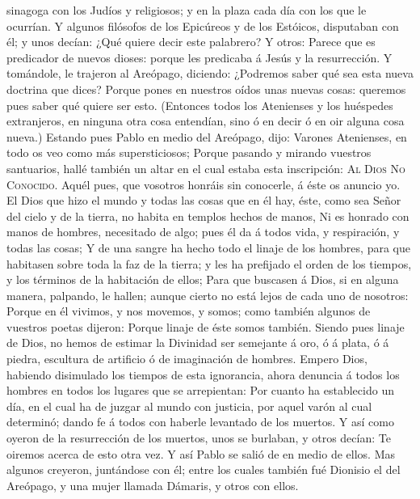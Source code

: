sinagoga con los Judíos y religiosos; y en la plaza cada día con los que
le ocurrían.  Y algunos filósofos de los Epicúreos y de
los Estóicos, disputaban con él; y unos decían: ¿Qué quiere decir este
palabrero? Y otros: Parece que es predicador de nuevos dioses: porque
les predicaba á Jesús y la resurrección.  Y tomándole, le
trajeron al Areópago, diciendo: ¿Podremos saber qué sea esta nueva
doctrina que dices?  Porque pones en nuestros oídos unas
nuevas cosas: queremos pues saber qué quiere ser esto. 
(Entonces todos los Atenienses y los huéspedes extranjeros, en ninguna
otra cosa entendían, sino ó en decir ó en oir alguna cosa nueva.)
 Estando pues Pablo en medio del Areópago, dijo: Varones
Atenienses, en todo os veo como más supersticiosos; 
Porque pasando y mirando vuestros santuarios, hallé también un altar en
el cual estaba esta inscripción: \textsc{Al} \textsc{Dios} \textsc{No}
\textsc{Conocido}. Aquél pues, que vosotros honráis sin conocerle, á
éste os anuncio yo.  El Dios que hizo el mundo y todas
las cosas que en él hay, éste, como sea Señor del cielo y de la tierra,
no habita en templos hechos de manos,  Ni es honrado con
manos de hombres, necesitado de algo; pues él da á todos vida, y
respiración, y todas las cosas;  Y de una sangre ha hecho
todo el linaje de los hombres, para que habitasen sobre toda la faz de
la tierra; y les ha prefijado el orden de los tiempos, y los términos de
la habitación de ellos;  Para que buscasen á Dios, si en
alguna manera, palpando, le hallen; aunque cierto no está lejos de cada
uno de nosotros:  Porque en él vivimos, y nos movemos, y
somos; como también algunos de vuestros poetas dijeron: Porque linaje de
éste somos también.  Siendo pues linaje de Dios, no hemos
de estimar la Divinidad ser semejante á oro, ó á plata, ó á piedra,
escultura de artificio ó de imaginación de hombres. 
Empero Dios, habiendo disimulado los tiempos de esta ignorancia, ahora
denuncia á todos los hombres en todos los lugares que se arrepientan:
 Por cuanto ha establecido un día, en el cual ha de
juzgar al mundo con justicia, por aquel varón al cual determinó; dando
fe á todos con haberle levantado de los muertos.  Y así
como oyeron de la resurrección de los muertos, unos se burlaban, y otros
decían: Te oiremos acerca de esto otra vez.  Y así Pablo
se salió de en medio de ellos.  Mas algunos creyeron,
juntándose con él; entre los cuales también fué Dionisio el del
Areópago, y una mujer llamada Dámaris, y otros con ellos.

